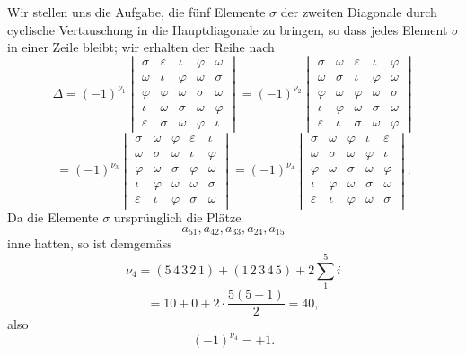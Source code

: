 \documentclass[11pt]{article}
\providecommand{\weberpage}[1]{}
\let\Delta\varDelta
\begin{document}
\weberpage{31}
Wir stellen uns die Aufgabe, die f\"unf Elemente $\sigma$ der zweiten Diagonale
durch cyclische Vertauschung in die Hauptdiagonale zu bringen, so dass jedes
Element $\sigma$ in einer Zeile bleibt; wir erhalten der Reihe nach
\[
\Delta = (-1)^{\nu_1}
\begin{vmatrix}
\sigma & \varepsilon & \iota & \varphi & \omega \\
\omega & \iota & \varphi & \omega & \sigma \\
\varphi & \varphi & \omega & \sigma & \omega \\
\iota & \omega & \sigma & \omega & \varphi \\
\varepsilon & \sigma & \omega & \varphi & \iota
\end{vmatrix}
=
(-1)^{\nu_2}
\begin{vmatrix}
\sigma & \omega & \varepsilon & \iota & \varphi \\
\omega & \sigma & \iota & \varphi & \omega \\
\varphi & \omega & \varphi & \omega & \sigma \\
\iota & \varphi & \omega & \sigma & \omega \\
\varepsilon & \iota & \sigma & \omega & \varphi
\end{vmatrix}
\]
\[
= (-1)^{\nu_3}
\begin{vmatrix}
\sigma & \omega & \varphi & \varepsilon & \iota \\
\omega & \sigma & \omega & \iota & \varphi \\
\varphi & \omega & \sigma & \varphi & \omega \\
\iota & \varphi & \omega & \omega & \sigma \\
\varepsilon & \iota & \varphi & \sigma & \omega
\end{vmatrix}
=
(-1)^{\nu_4}
\begin{vmatrix}
\sigma & \omega & \varphi & \iota & \varepsilon \\
\omega & \sigma & \omega & \varphi & \iota \\
\varphi & \omega & \sigma & \omega & \varphi \\
\iota & \varphi & \omega & \sigma & \omega \\
\varepsilon & \iota & \varphi & \omega & \sigma
\end{vmatrix}.
\]
Da die Elemente $\sigma$ urspr\"unglich die Pl\"atze
\[
a_{51}, a_{42}, a_{33}, a_{24}, a_{15}
\]
inne hatten, so ist demgem\"ass
\[
\nu_4 = (5\,4\,3\,2\,1) + (1\,2\,3\,4\,5) + 2\sum_1^5 i
\]
\[
= 10 + 0 + 2\cdot\frac{5(5+1)}{2} = 40,
\]
also
\[
(-1)^{\nu_4} = +1.
\]
\end{document}
